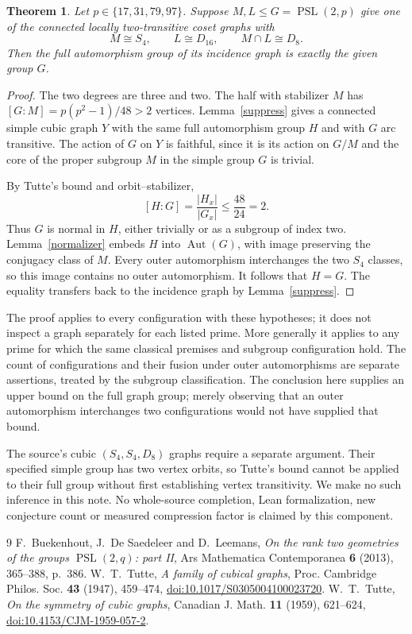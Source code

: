 \documentclass[11pt]{article}
\newtheorem{theorem}[lemma]{Theorem}
\newcommand{\PSL}{\operatorname{PSL}}
\newcommand{\Aut}{\operatorname{Aut}}
\begin{document}
\begin{theorem}\label{aut}
Let $p\in\{17,31,79,97\}$. Suppose $M,L\le G=\PSL(2,p)$ give
one of the connected locally two-transitive coset graphs with
\[
 M\cong S_4,\qquad L\cong D_{16},\qquad M\cap L\cong D_8.
\]
Then the full automorphism group of its incidence graph is exactly the
given group $G$.
\end{theorem}
\begin{proof}
The two degrees are three and two. The half with stabilizer $M$ has
$[G:M]=p(p^2-1)/48>2$ vertices. Lemma~\ref{suppress} gives a connected
simple cubic graph $Y$ with the same full automorphism group $H$ and
with $G$ arc transitive. The action of $G$ on $Y$ is faithful, since
it is its action on $G/M$ and the core of the proper subgroup $M$ in
the simple group $G$ is trivial.

By Tutte's bound and orbit--stabilizer,
\[
 [H:G]=\frac{|H_x|}{|G_x|}\le\frac{48}{24}=2.
\]
Thus $G$ is normal in $H$, either trivially or as a subgroup of index
two. Lemma~\ref{normalizer} embeds $H$ into $\Aut(G)$, with image
preserving the conjugacy class of $M$. Every outer automorphism
interchanges the two $S_4$ classes, so this image contains no outer
automorphism. It follows that $H=G$. The equality transfers back to
the incidence graph by Lemma~\ref{suppress}.
\end{proof}

The proof applies to every configuration with these hypotheses; it does
not inspect a graph separately for each listed prime. More generally it
applies to any prime for which the same classical premises and subgroup
configuration hold. The count of configurations and their fusion under
outer automorphisms are separate assertions, treated by the subgroup
classification. The conclusion here supplies an upper bound on the full
graph group; merely observing that an outer automorphism interchanges
two configurations would not have supplied that bound.

The source's cubic $(S_4,S_4,D_8)$ graphs require a separate argument.
Their specified simple group has two vertex orbits, so Tutte's bound
cannot be applied to their full group without first establishing vertex
transitivity. We make no such inference in this note. No whole-source
completion, Lean formalization, new conjecture count or measured
compression factor is claimed by this component.

\begin{thebibliography}{9}
 F.~Buekenhout, J.~De Saedeleer and D.~Leemans,
\emph{On the rank two geometries of the groups $\PSL(2,q)$: part II},
Ars Mathematica Contemporanea \textbf{6} (2013), 365--388, p.~386.
 W.~T.~Tutte, \emph{A family of cubical graphs},
Proc. Cambridge Philos. Soc. \textbf{43} (1947), 459--474,
\href{https://doi.org/10.1017/S0305004100023720}{doi:10.1017/S0305004100023720}.
 W.~T.~Tutte, \emph{On the symmetry of cubic graphs},
Canadian J. Math. \textbf{11} (1959), 621--624,
\href{https://doi.org/10.4153/CJM-1959-057-2}{doi:10.4153/CJM-1959-057-2}.
\end{thebibliography}
\end{document}
